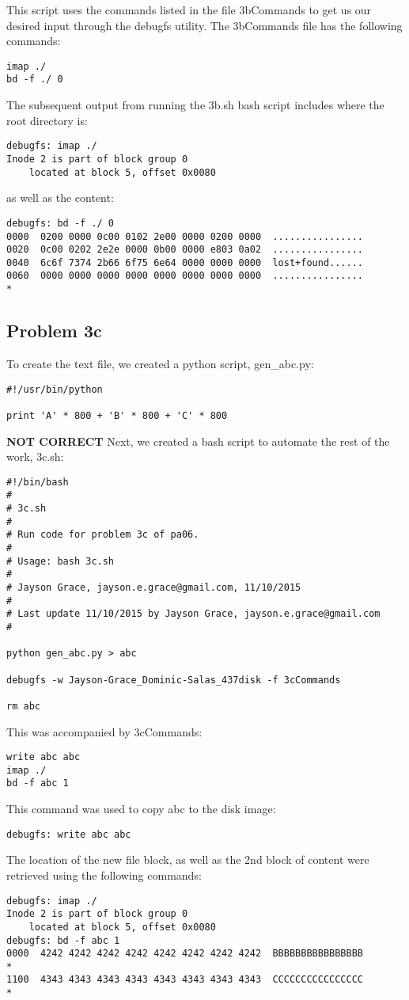 \documentclass[12pt, a4paper, oneside]{article}
\begin{document}
This script uses the commands listed in the file 3bCommands to get us our desired input through the debugfs utility. The 3bCommands file has the following commands: 
\begin{lstlisting}
imap ./
bd -f ./ 0
\end{lstlisting}
The subsequent output from running the 3b.sh bash script includes where the root directory is:
\begin{lstlisting}
debugfs: imap ./
Inode 2 is part of block group 0
	located at block 5, offset 0x0080
\end{lstlisting}
as well as the content:
\begin{lstlisting}
debugfs: bd -f ./ 0
0000  0200 0000 0c00 0102 2e00 0000 0200 0000  ................
0020  0c00 0202 2e2e 0000 0b00 0000 e803 0a02  ................
0040  6c6f 7374 2b66 6f75 6e64 0000 0000 0000  lost+found......
0060  0000 0000 0000 0000 0000 0000 0000 0000  ................
*
\end{lstlisting}

\subsection*{Problem 3c}
To create the text file, we created a python script, gen\_abc.py:
\begin{lstlisting}
#!/usr/bin/python

print 'A' * 800 + 'B' * 800 + 'C' * 800
\end{lstlisting}

\textbf{NOT CORRECT}
Next, we created a bash script to automate the rest of the work, 3c.sh:
\begin{lstlisting}
#!/bin/bash
# 
# 3c.sh
#
# Run code for problem 3c of pa06.
#
# Usage: bash 3c.sh
#
# Jayson Grace, jayson.e.grace@gmail.com, 11/10/2015
#
# Last update 11/10/2015 by Jayson Grace, jayson.e.grace@gmail.com
# 

python gen_abc.py > abc

debugfs -w Jayson-Grace_Dominic-Salas_437disk -f 3cCommands

rm abc
\end{lstlisting}
This was accompanied by 3cCommands: 
\begin{lstlisting}
write abc abc
imap ./
bd -f abc 1
\end{lstlisting}
This command was used to copy abc to the disk image:
\begin{lstlisting}
debugfs: write abc abc
\end{lstlisting}
The location of the new file block, as well as the 2nd block of content were retrieved using the following commands:
\begin{lstlisting}
debugfs: imap ./
Inode 2 is part of block group 0
	located at block 5, offset 0x0080
debugfs: bd -f abc 1
0000  4242 4242 4242 4242 4242 4242 4242 4242  BBBBBBBBBBBBBBBB
*
1100  4343 4343 4343 4343 4343 4343 4343 4343  CCCCCCCCCCCCCCCC
*
\end{lstlisting}
\end{document}
